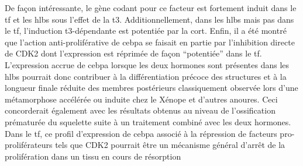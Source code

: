 \documentclass[../main.tex]{subfiles}
\begin{document}
		De façon intéressante, le gène codant pour ce facteur est fortement induit dans le \gls{tf} et les \glspl{hlb} sous l'effet de la \gls{t3}.
		Additionnellement, dans les \glspl{hlb} mais pas dans le \gls{tf}, l'induction \gls{t3}-dépendante est potentiée par la \gls{cort}.
		Enfin, il a été montré que l'action anti-proliférative de \gls{cebpa} se faisait en partie par l'inhibition directe de CDK2 \citep{Wang2001} dont l'expression est réprimée de façon ``potentiée'' dans le \gls{tf}.
		L'expression accrue de \gls{cebpa} lorsque les deux hormones sont présentes dans les \glspl{hlb} pourrait donc contribuer à la différentiation précoce des structures et à la longueur finale réduite des membres postérieurs classiquement observée lors d'une métamorphose accélérée ou induite chez le Xénope \citep{Gomez-Mestre2013a} et d'autres anoures.
		Ceci concorderait également avec les résultats obtenus au niveau de l'ossification prématurée du squelette suite à un traitement combiné avec les deux hormones.
		Dans le \gls{tf}, ce profil d'expression de \gls{cebpa} associé à la répression de facteurs pro-proliférateurs tels que CDK2 pourrait être un mécanisme général d’arrêt de la prolifération dans un tissu en cours de résorption
\end{document}
